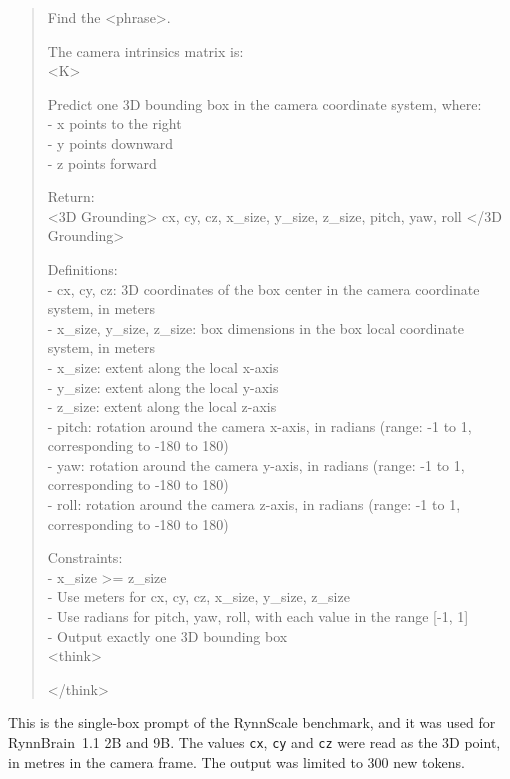 \begin{quote}\small\ttfamily\raggedright
Find the <phrase>.
\par\smallskip
The camera intrinsics matrix is:\\
<K>
\par\smallskip
Predict one 3D bounding box in the camera coordinate system, where:\\
- x points to the right\\
- y points downward\\
- z points forward
\par\smallskip
Return:\\
<3D Grounding> cx, cy, cz, x\_size, y\_size, z\_size, pitch, yaw, roll </3D Grounding>
\par\smallskip
Definitions:\\
- cx, cy, cz: 3D coordinates of the box center in the camera coordinate system, in meters\\
- x\_size, y\_size, z\_size: box dimensions in the box local coordinate system, in meters\\
\hspace{1em}- x\_size: extent along the local x-axis\\
\hspace{1em}- y\_size: extent along the local y-axis\\
\hspace{1em}- z\_size: extent along the local z-axis\\
- pitch: rotation around the camera x-axis, in radians (range: -1 to 1, corresponding to -180\textdegree{} to 180\textdegree{})\\
- yaw: rotation around the camera y-axis, in radians (range: -1 to 1, corresponding to -180\textdegree{} to 180\textdegree{})\\
- roll: rotation around the camera z-axis, in radians (range: -1 to 1, corresponding to -180\textdegree{} to 180\textdegree{})
\par\smallskip
Constraints:\\
- x\_size >= z\_size\\
- Use meters for cx, cy, cz, x\_size, y\_size, z\_size\\
- Use radians for pitch, yaw, roll, with each value in the range [-1, 1]\\
- Output exactly one 3D bounding box\\
<think>
\par\smallskip
</think>\\
\mbox{}
\end{quote}
This is the single-box prompt of the RynnScale benchmark, and it was used for RynnBrain~1.1 2B and 9B.
The values \texttt{cx}, \texttt{cy} and \texttt{cz} were read as the 3D point, in metres in the camera frame.
The output was limited to 300 new tokens.

